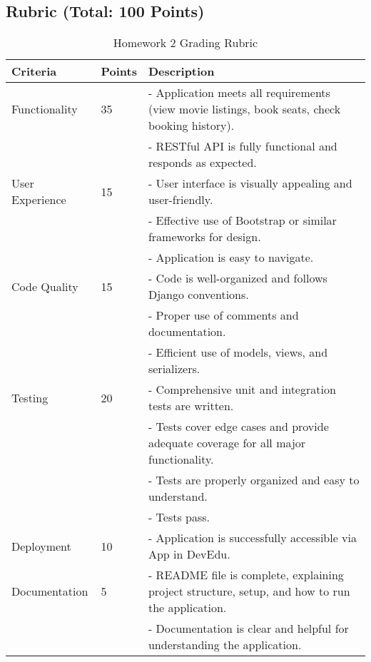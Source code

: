 \documentclass{article}
\begin{document}
\subsection{Rubric (Total: 100 Points)}

\begin{table}[ht]
\centering
\small
\begin{tabular}{l l p{8cm}}
\hline
\textbf{Criteria} & \textbf{Points} & \textbf{Description} \\
\hline
Functionality &
35 &
- Application meets all requirements (view movie listings, book seats, check booking history).\\
& &
- RESTful API is fully functional and responds as expected. \newline \\
User Experience &
15 &
- User interface is visually appealing and user-friendly.\\
& &
- Effective use of Bootstrap or similar frameworks for design.\\
& &
- Application is easy to navigate. \newline \\
Code Quality &
15 &
- Code is well-organized and follows Django conventions. \\
& &
- Proper use of comments and documentation. \\
& &
- Efficient use of models, views, and serializers. \newline \\
Testing &
20 &
- Comprehensive unit and integration tests are written.\\
& &
- Tests cover edge cases and provide adequate coverage for all major functionality.\\
& &
- Tests are properly organized and easy to understand. \\
& & 
- Tests pass. \newline \\
Deployment &
10 &
- Application is successfully accessible via App in DevEdu. \newline \\ 
Documentation &
5 &
- README file is complete, explaining project structure, setup, and how to run the application.\\
& &
- Documentation is clear and helpful for understanding the application.\\
\hline
\end{tabular}
\caption{Homework 2 Grading Rubric}
\end{table}
\end{document}
